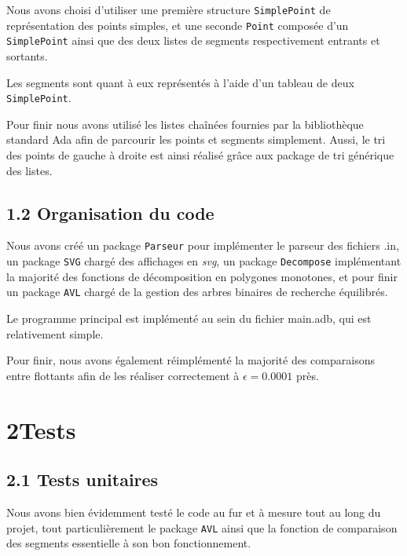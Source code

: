 \documentclass [a4paper,11pt] {report}
\begin{document}
Nous avons choisi d'utiliser une première structure \lstinline!SimplePoint! de représentation des points simples, et une seconde \lstinline!Point! composée d'un \lstinline!SimplePoint! ainsi que des deux listes de segments respectivement entrants et sortants.

Les segments sont quant à eux représentés à l'aide d'un tableau de deux \lstinline!SimplePoint!.

Pour finir nous avons utilisé les listes chaînées fournies par la bibliothèque standard Ada afin de parcourir les points et segments simplement. Aussi, le tri des points de gauche à droite est ainsi réalisé grâce aux package de tri générique des listes.



\subsection* {1.2\hspace{3mm} Organisation du code}

Nous avons créé un package \lstinline!Parseur! pour implémenter le parseur des fichiers .in, un package \lstinline!SVG! chargé des affichages en \textit{svg}, un package \lstinline!Decompose! implémentant la majorité des fonctions de décomposition en polygones monotones, et pour finir un package \lstinline!AVL! chargé de la gestion des arbres binaires de recherche équilibrés.

Le programme principal est implémenté au sein du fichier main.adb, qui est relativement simple.

Pour finir, nous avons également réimplémenté la majorité des comparaisons entre flottants afin de les réaliser correctement à $\epsilon = 0.0001$ près.


\section* {2\hspace{5mm}Tests }

\subsection* {2.1\hspace{3mm} Tests unitaires}

Nous avons bien évidemment testé le code au fur et à mesure tout au long du projet, tout particulièrement le package \lstinline!AVL! ainsi que la fonction de comparaison des segments essentielle à son bon fonctionnement.
\end{document}

